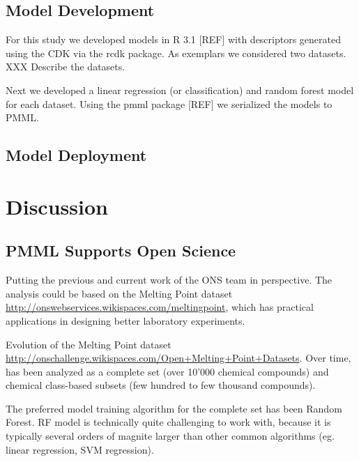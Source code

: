 \documentclass[12pt,letterpaper]{article}
\begin{document}
\subsection{Model Development}
\label{sec:model-development}

For this study we developed models in R 3.1 [REF] with descriptors
generated using the CDK \cite{Steinbeck:2003bh} via the rcdk
\cite{Guha:2007aa} package. As exemplars we considered two
datasets. XXX Describe the datasets.

Next we developed a linear regression (or classification) and random
forest  model  for each dataset. Using the pmml package [REF] we
serialized the models to PMML.

\subsection{Model Deployment}
\label{sec:model-deployment}

\section{Discussion}
\label{sec:discussion}

\subsection{PMML Supports Open Science}
\label{sec:pmml-supports-open}

Putting the previous and current work of the ONS team in perspective.
The analysis could be based on the Melting Point dataset \url{http://onswebservices.wikispaces.com/meltingpoint}, which has practical 
applications in designing better laboratory experiments.

Evolution of the Melting Point dataset \url{http://onschallenge.wikispaces.com/Open+Melting+Point+Datasets}. Over time, has been analyzed as a complete set 
(over 10'000 chemical compounds) and chemical class-based subsets (few
hundred to few thousand compounds).

The preferred model training algorithm for the complete set has been
Random Forest. RF model is technically quite challenging to work with,
because it is typically several orders of magnite larger than other
common algorithms (eg. linear regression, SVM regression).
\end{document}
